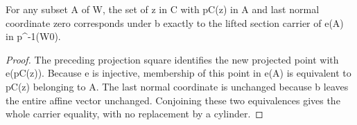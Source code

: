 \begin{lemma}
\label{hir:actual-nested-section-coordinate-carrier}
\leanok
{}
For any subset A of W, the set of z in C with pC(z) in A and last normal
coordinate zero corresponds under b exactly to the lifted section carrier
of e(A) in p^{-1}(W0).
\end{lemma}
\begin{proof}
The preceding projection square identifies the new projected point with e(pC(z)).
Because e is injective, membership of this point in e(A) is equivalent to
pC(z) belonging to A. The last normal coordinate is unchanged because b
leaves the entire affine vector unchanged. Conjoining these two equivalences
gives the whole carrier equality, with no replacement by a cylinder.
\end{proof}
